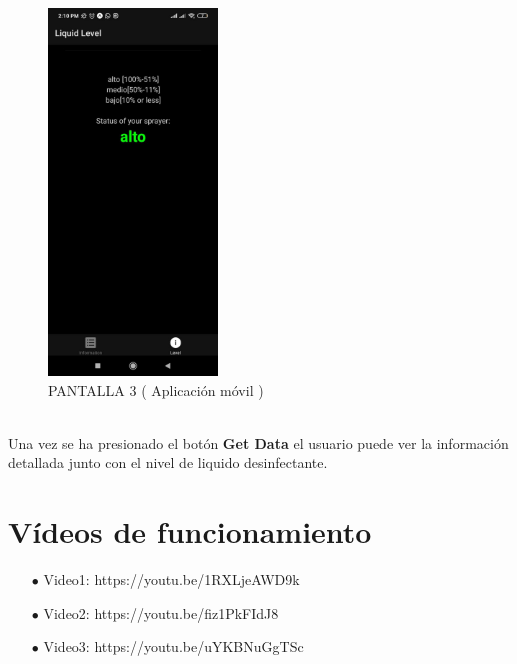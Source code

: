 \documentclass[osajnl,twocolumn,showpacs,superscriptaddress,10pt]{revtex4-1}
\begin{document}
\begin{figure} [H] \centering 
\caption{PANTALLA 3 ( Aplicación móvil )}
\includegraphics[width=0.4\textwidth]{img3.jpeg} 
\end{figure}
\\
Una vez se ha presionado el botón \textbf{Get Data}  el usuario puede ver la información detallada junto con el nivel de liquido desinfectante.

\section{Vídeos de funcionamiento}
\begin{itemize}
    \item[$\bullet$]Video1: https://youtu.be/1RXLjeAWD9k 
    \item[$\bullet$]Video2: https://youtu.be/fiz1PkFIdJ8
    \item[$\bullet$]Video3: https://youtu.be/uYKBNuGgTSc
\end{itemize}
\end{document}
